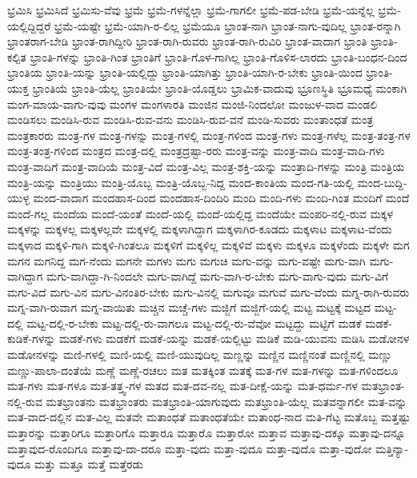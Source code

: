 {ಭ್ರಮಿಸಿ
ಭ್ರಮಿಸಿದೆ
ಭ್ರಮಿಸು-ವೆವು
ಭ್ರಮೆ
ಭ್ರಮೆ-ಗಳನ್ನೆಲ್ಲಾ
ಭ್ರಮೆ-ಗಾಗಲೀ
ಭ್ರಮೆ-ಪಡ-ಬೇಡಿ
ಭ್ರಮೆ-ಯನ್ನೆಲ್ಲ
ಭ್ರಮೆ-ಯಲ್ಲಿದ್ದಿದ್ದರೆ
ಭ್ರಮೆ-ಯಷ್ಟೇ
ಭ್ರಮೆ-ಯಾಗಿ-ರ-ಲಿಲ್ಲ
ಭ್ರಮೆಯೂ
ಭ್ರಾಂತ-ನಾಗಿ
ಭ್ರಾಂತ-ನಾಗು-ವುದಿಲ್ಲ
ಭ್ರಾಂತ-ರನ್ನಾಗಿ
ಭ್ರಾಂತರಾಗ-ಬೇಡಿ
ಭ್ರಾಂತ-ರಾಗಿದ್ದೀರಿ
ಭ್ರಾಂತ-ರಾಗಿ-ರುವರು
ಭ್ರಾಂತ-ರಾಗಿ-ರುವಿರಿ
ಭ್ರಾಂತ-ವಾದಾಗ
ಭ್ರಾಂತಿ
ಭ್ರಾಂತಿ-ಕಲ್ಪಿತ
ಭ್ರಾಂತಿ-ಗಳನ್ನು
ಭ್ರಾಂತಿ-ಗಿಂತ
ಭ್ರಾಂತಿಗೆ
ಭ್ರಾಂತಿ-ಗೊಳ-ಗಾಗಿಲ್ಲ
ಭ್ರಾಂತಿ-ಗೊಳಿಸ-ಲಾರದು
ಭ್ರಾಂತಿ-ಬಂಧನ-ದಿಂದ
ಭ್ರಾಂತಿಯ
ಭ್ರಾಂತಿ-ಯನ್ನು
ಭ್ರಾಂತಿ-ಯಲ್ಲಿದ್ದು
ಭ್ರಾಂತಿ-ಯಾಗಿತ್ತು
ಭ್ರಾಂತಿ-ಯಾಗಿ-ರ-ಬೇಕು
ಭ್ರಾಂತಿ-ಯಿಂದ
ಭ್ರಾಂತಿ-ಯುಕ್ತ
ಭ್ರಾಂತಿಯೆ
ಭ್ರಾಂತಿ-ಯೆಲ್ಲ
ಭ್ರಾಂತಿಯೇ
ಭ್ರಾಂತಿ-ಯೊಡ್ಡಲು
ಭ್ರಾಮಿಕ-ವಾದುವು
ಭ್ರೂಣಸ್ಥಿತಿ
ಭ್ರೂಮಧ್ಯೆ
ಮಂಕಾಗಿ
ಮಂಗ-ಮಾಯ-ವಾಗು-ವುವು
ಮಂಗಳ
ಮಂಗಳಾರತಿ
ಮಂಜಿನ
ಮಂಜಿ-ನಿಂದಲೋ
ಮಂಜುಳ-ವಾದ
ಮಂಡಲಿ
ಮಂಡಿಸಲು
ಮಂಡಿಸಿ-ರುವ
ಮಂಡಿಸಿ-ರುವ-ವನು
ಮಂಡಿಸಿ-ರುವ-ವನೆ
ಮಂಡಿ-ಸುವರು
ಮಂತಾಂಧತೆ
ಮಂತ್ರ
ಮಂತ್ರಕಾರರು
ಮಂತ್ರ-ಗಳ
ಮಂತ್ರ-ಗಳನ್ನು
ಮಂತ್ರ-ಗಳಲ್ಲಿ
ಮಂತ್ರ-ಗಳಿಂದ
ಮಂತ್ರ-ಗಳು
ಮಂತ್ರ-ಗಳೆಲ್ಲ
ಮಂತ್ರ-ತಂತ್ರ-ಗಳ
ಮಂತ್ರ-ತಂತ್ರ-ಗಳಿಂದ
ಮಂತ್ರದ
ಮಂತ್ರ-ದಲ್ಲಿ
ಮಂತ್ರದ್ರಷ್ಟಾ-ರರು
ಮಂತ್ರ-ವನ್ನು
ಮಂತ್ರ-ವಾದಿ
ಮಂತ್ರ-ವಾದಿ-ಗಳು
ಮಂತ್ರ-ವಾದಿಗೆ
ಮಂತ್ರ-ವಾದಿಯೆ
ಮಂತ್ರ-ವಿದೆ
ಮಂತ್ರ-ವಿಲ್ಲ
ಮಂತ್ರ-ಶಕ್ತಿ-ಯನ್ನು
ಮಂತ್ರಾದಿ-ಗಳನ್ನು
ಮಂತ್ರಿ
ಮಂತ್ರಿಯ
ಮಂತ್ರಿ-ಯನ್ನು
ಮಂತ್ರಿಯು
ಮಂತ್ರಿ-ಯೊಬ್ಬ
ಮಂತ್ರಿ-ಯೊಬ್ಬ-ನಿದ್ದ
ಮಂದ-ಕಾಂತಿಯ
ಮಂದ-ಗತಿ-ಯಲ್ಲಿ
ಮಂದ-ಬುದ್ದಿ-ಯುಳ್ಳ
ಮಂದ-ವಾದಾಗ
ಮಂದಹಾಸ-ದಿಂದ
ಮಂದಹಾಸ-ದಿಂದಿರಿ
ಮಂದಿ
ಮಂದಿ-ಗಳು
ಮಂದಿ-ಗಿಂತ
ಮಂದಿಗೆ
ಮಂದೆ
ಮಂದೆ-ಗಲ್ಲ
ಮಂದೆಯ
ಮಂದೆ-ಯಂತೆ
ಮಂದೆ-ಯಲ್ಲಿ
ಮಂದೆ-ಯಲ್ಲಿದ್ದ
ಮಂದೆಯೇ
ಮಂಪರಿ-ನಲ್ಲಿ-ರುವ
ಮಕ್ಕಳ
ಮಕ್ಕಳನ್ನು
ಮಕ್ಕಳಲ್ಲ
ಮಕ್ಕಳಲ್ಲವೇ
ಮಕ್ಕಳಲ್ಲಿ
ಮಕ್ಕಳಾಗಿದ್ದಾಗ
ಮಕ್ಕಳಾಗಿರ-ಕೂಡದು
ಮಕ್ಕಳಾಟ
ಮಕ್ಕಳಾಟ-ವೆಂದು
ಮಕ್ಕಳಾದ
ಮಕ್ಕಳಿ-ಗಾಗಿ
ಮಕ್ಕಳಿ-ಗಿಂತಲೂ
ಮಕ್ಕಳಿಗೆ
ಮಕ್ಕಳಿಲ್ಲ
ಮಕ್ಕಳಿವೆ
ಮಕ್ಕಳು
ಮಕ್ಕಳೂ
ಮಕ್ಕಳೆಂದು
ಮಕ್ಕಳೇ
ಮಗ
ಮಗನ
ಮಗನಿದ್ದ
ಮಗ-ನೆಂದು
ಮಗನೇ
ಮಗಳು
ಮಗು
ಮಗುಚಿ
ಮಗು-ವನ್ನು
ಮಗು-ವಷ್ಟೇ
ಮಗು-ವಾಗಿ
ಮಗು-ವಾಗಿದ್ದಾಗ
ಮಗು-ವಾಗಿದ್ದಾ-ಗಿ-ನಿಂದಲೇ
ಮಗು-ವಾಗಿದ್ದೆ
ಮಗು-ವಾಗಿ-ರ-ಬೇಕು
ಮಗು-ವಾಗು-ವುದು
ಮಗು-ವಿಗೆ
ಮಗು-ವಿದೆ
ಮಗು-ವಿನ
ಮಗು-ವಿನಂತಿರ-ಬೇಕು
ಮಗು-ವಿನಲ್ಲಿ
ಮಗುವೂ
ಮಗುವೆ
ಮಗು-ವೆಂದು
ಮಗ್ನ-ರಾಗಿ-ರುವರು
ಮಗ್ನ-ವಾಗಿ-ರುವಾಗ
ಮಗ್ನ-ವಾಯಿತು
ಮಚ್ಚಿನ
ಮಚ್ಚೆ-ಗಳು
ಮಜ್ಜಿಗೆ
ಮಜ್ಜಿಗೆ-ಯಲ್ಲಿ
ಮಟ್ಟ
ಮಟ್ಟಕ್ಕೆ
ಮಟ್ಟದ
ಮಟ್ಟ-ದಲ್ಲಿ
ಮಟ್ಟ-ದಲ್ಲಿ-ರ-ಬೇಕು
ಮಟ್ಟ-ದಲ್ಲಿ-ರು-ವಾಗಲೂ
ಮಟ್ಟ-ದಲ್ಲಿ-ರು-ವೆವೋ
ಮಟ್ಟದ್ದು
ಮಟ್ಟಿಗೆ
ಮಡಕೆ
ಮಡಕೆ-ಕುಡಿಕೆ-ಗಳನ್ನು
ಮಡಕೆ-ಗಳು
ಮಡಕೆಗೆ
ಮಡಕೆ-ಯನ್ನು
ಮಡಕೆ-ಯಲ್ಲಿಟ್ಟು
ಮಡಿಕೆ
ಮಡಿ-ಯುವನು
ಮಡಿಸಿ
ಮಡೋನಳ
ಮಡೋನಳನ್ನು
ಮಣಿ-ಗಳಲ್ಲಿ
ಮಣಿ-ಯಲ್ಲಿ
ಮಣಿ-ಯುವುದಿಲ್ಲ
ಮಣ್ಣನ್ನು
ಮಣ್ಣಿನ
ಮಣ್ಣಿನಂತೆ
ಮಣ್ಣಿನಲ್ಲಿ
ಮಣ್ಣು
ಮಣ್ಣು-ಪಾಲಾ-ದಂತೆಯೆ
ಮಣ್ಣೆ
ಮಣ್ಣೆ-ರಚಲು
ಮತ
ಮತಕ್ಕಿಂತ
ಮತಕ್ಕೆ
ಮತ-ಗಳ
ಮತ-ಗಳನ್ನು
ಮತ-ಗಳಿಂದಲೂ
ಮತ-ಗಳು
ಮತ-ಗಳೂ
ಮತ-ತತ್ತ್ವ-ಗಳ
ಮತದ
ಮತ-ದವ-ನಲ್ಲ
ಮತ-ದೀಕ್ಷೆ-ಯನ್ನು
ಮತ-ಧರ್ಮ-ಗಳ
ಮತಭ್ರಾಂತ-ನಲ್ಲಿ-ರುವ
ಮತಭ್ರಾಂತನು
ಮತಭ್ರಾಂತರು
ಮತಭ್ರಾಂತಿ-ಯಾಗುವುದು
ಮತಭ್ರಾಂತಿ-ಯೆಲ್ಲ
ಮತವನ್ನಾಗಲೀ
ಮತ-ವನ್ನು
ಮತ-ವಾದ-ದಲ್ಲಿನ
ಮತ-ವಿಲ್ಲ
ಮತವೇ
ಮತಾಂಧತೆ
ಮತಾಂಧತೆಯೇ
ಮತಾಂಧ-ನಾದ
ಮತಿ-ಗೆಟ್ಟ
ಮತೊಬ್ಬ
ಮತ್ತಷ್ಟು
ಮತ್ತಾರನ್ನು
ಮತ್ತಾರಿಗೂ
ಮತ್ತಾರಿಗೊ
ಮತ್ತಾರೂ
ಮತ್ತಾರೊ
ಮತ್ತಾರೋ
ಮತ್ತಾವ
ಮತ್ತಾವು-ದಕ್ಕೂ
ಮತ್ತಾವು-ದನ್ನೂ
ಮತ್ತಾವುದ-ರೊಂದಿಗೂ
ಮತ್ತಾವು-ದಾ-ದರೂ
ಮತ್ತಾ-ವುದು
ಮತ್ತಾ-ವುದೂ
ಮತ್ತಾ-ವುದೊ
ಮತ್ತಾ-ವುದೋ
ಮತ್ತಿನ್ಯಾ-ವುದೂ
ಮತ್ತು
ಮತ್ತೂ
ಮತ್ತೆ
ಮತ್ತೆರಡು
}
